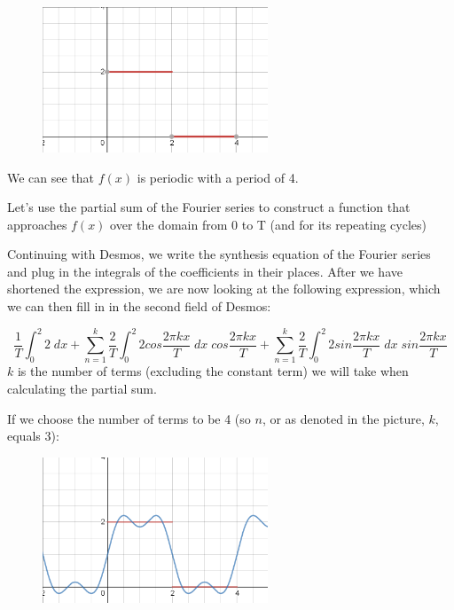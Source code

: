 \documentclass[a4paper]{article}
\begin{document}
\begin{figure}[H]
	\centering
	\includegraphics[width=0.6\textwidth]{baseGraph.png}
\end{figure}

We can see that $f(x)$ is periodic with a period of 4.

Let's use the partial sum of the Fourier series to construct a function that approaches $f(x)$ over the domain from 0 to T (and for its repeating cycles)

Continuing with Desmos, we write the synthesis equation of the Fourier series and plug in the integrals of the coefficients in their places. After we have shortened the expression, we are now looking at the following expression, which we can then fill in in the second field of Desmos:

\begin{equation*}
	\frac{1}{T}\int_{0}^{2}2\;dx + \sum\limits_{n=1}^k \frac{2}{T}\int_{0}^{2}2cos\frac{2\pi kx}{T}\;dx\;cos\frac{2\pi kx}{T} + \sum\limits_{n=1}^k \frac{2}{T}\int_{0}^{2}2sin\frac{2\pi kx}{T}\;dx\;sin\frac{2\pi kx}{T}
\end{equation*}
$k$ is the number of terms (excluding the constant term) we will take when calculating the partial sum.

If we choose the number of terms to be 4 (so $n$, or as denoted in the picture, $k$, equals $3$):

\begin{figure}[H]
	\centering
	\includegraphics[width=0.6\textwidth]{k=3.png}
\end{figure}
\end{document}
